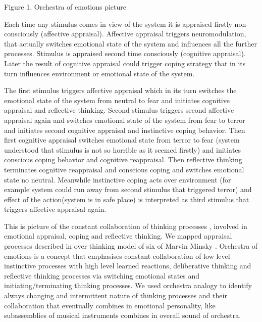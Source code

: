 \begin{center}
Figure 1. Orchestra of emotions picture
\end{center}

Each time any stimulus comes in view of the system it is appraised firstly non-consciously (affective appraisal). Affective appraisal triggers neuromodulation, that actually switches emotional state of the system and influences all the further processes. Stimulus is appraised second time consciously (cognitive appraisal). Later the result of cognitive appraisal could trigger coping strategy that in its turn influences environment or emotional state of the system.

The first stimulus triggers affective appraisal which in its turn switches the emotional state of the system from neutral to fear and initiates cognitive appraisal and reflective thinking. Second stimulus triggers second affective appraisal again and switches emotional state of the system from fear to terror and initiates second cognitive appraisal and instinctive coping behavior. Then first cognitive appraisal switches emotional state from terror to fear (system understood that stimulus is not so horrible as it seemed firstly) and initiates conscious coping behavior and cognitive reappraisal. Then reflective thinking terminates cognitive reappraisal and conscious coping and switches emotional state no neutral. Meanwhile instinctive coping acts over environment (for example system could run away from second stimulus that triggered terror) and effect of the action(system is in safe place) is interpreted as third stimulus that triggers affective appraisal again.

This is picture of the constant collaboration of thinking processes \cite{emotionmachine}, involved in emotional appraisal, coping and reflective thinking. We mapped appraisal processes described in \cite{putting_appraisal_in_context, appraisal_determinants_of_emotions, appraisal_considered_as_a_process} over thinking model of six of Marvin Minsky \cite{emotionmachine}. Orchestra of emotions is a concept that emphasises constant collaboration of low level instinctive processes with high level learned reactions, deliberative thinking and reflective thinking processes via switching emotional states and initiating/terminating thinking processes. We used orchestra analogy to identify always changing and intermittent nature of thinking processes and their  collaboration that eventually combines in emotional personality, like subassemblies of musical instruments combines in overall sound of orchestra.

